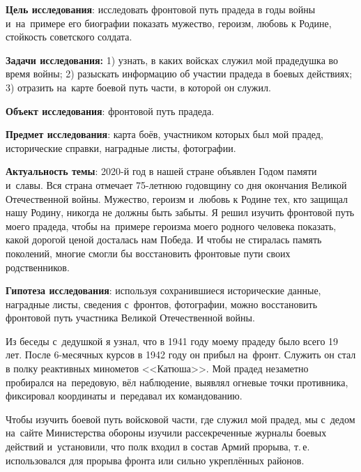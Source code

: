 


\makeProcTitleSchool



\textbf{Цель исследования}: исследовать фронтовой путь прадеда в годы войны и~на~примере его биографии показать мужество, героизм, любовь к Родине, стойкость советского солдата.

\textbf{Задачи исследования:} 1) узнать, в каких войсках служил мой прадедушка во время войны; 2) разыскать информацию об участии прадеда в боевых действиях; 3) отразить на~карте боевой путь части, в которой он служил.

\textbf{Объект исследования}: фронтовой путь прадеда.

\textbf{Предмет исследования}: карта боёв, участником которых был мой прадед, исторические справки, наградные листы, фотографии.

\textbf{Актуальность темы}: 2020-й год в нашей стране объявлен Годом памяти и~славы. Вся страна отмечает 75-летнюю годовщину со дня окончания Великой Отечественной войны. Мужество, героизм и~любовь к Родине тех, кто защищал нашу Родину, никогда не должны быть забыты. Я решил изучить фронтовой путь моего прадеда, чтобы на~примере героизма моего родного человека показать, какой дорогой ценой досталась нам Победа. И чтобы не стиралась память поколений, многие смогли бы восстановить фронтовые пути своих родственников.

\textbf{Гипотеза исследования}: используя сохранившиеся исторические данные, наградные листы, сведения с~фронтов, фотографии, можно восстановить фронтовой путь участника Великой Отечественной войны.

Из беседы с~дедушкой я узнал, что в 1941 году моему прадеду было всего 19 лет. После 6-месячных курсов в 1942 году он прибыл на~фронт. Служить он стал в полку реактивных минометов <<Катюша>>. Мой прадед незаметно пробирался на~передовую, вёл наблюдение, выявлял огневые точки противника, фиксировал координаты и~передавал их командованию.

Чтобы изучить боевой путь войсковой части, где служил мой прадед, мы с~дедом на~сайте Министерства обороны изучили рассекреченные журналы боевых действий и~установили, что полк входил в состав Армий прорыва, т.\,е. использовался для прорыва фронта или сильно укреплённых районов.


